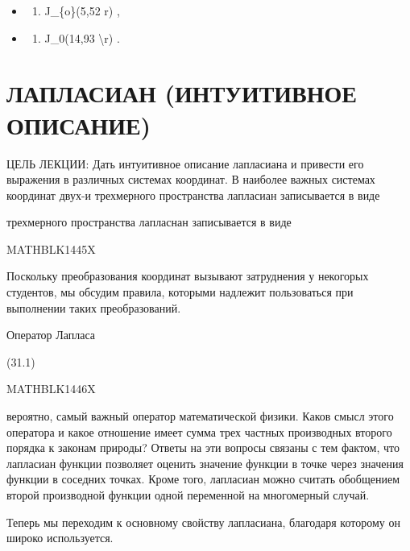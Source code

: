 \documentclass[
]{article}
\providecommand{\tightlist}{%
  \setlength{\itemsep}{0pt}\setlength{\parskip}{0pt}}
\begin{document}
{{{\begin{itemize}
  \begin{itemize}
  \tightlist
  \item
    \begin{enumerate}
    \def\labelenumi{\alph{enumi})}
    \tightlist
    \item
      J\_\{o\}(5,52 r) ,
    \end{enumerate}
  \item
    \begin{enumerate}
    \def\labelenumi{\arabic{enumi})}
    \setcounter{enumi}{5}
    \tightlist
    \item
      J\_0(14,93 \textbackslash r) .
    \end{enumerate}
  \end{itemize}
\end{itemize}

\section{ЛАПЛАСИАН (ИНТУИТИВНОЕ
ОПИСАНИЕ)}\label{ux43bux430ux43fux43bux430ux441ux438ux430ux43d-ux438ux43dux442ux443ux438ux442ux438ux432ux43dux43eux435-ux43eux43fux438ux441ux430ux43dux438ux435}

ЦЕЛЬ ЛЕКЦИИ: Дать интуитивное описание лапласиана и привести его
выражения в различных системах координат. В наиболее важных системах
координат двух-и трехмерного пространства лапласиан записывается в виде

трехмерного пространства лапласнан записывается в виде

MATHBLK1445X

Поскольку преобразования координат вызывают затруднения у некогорых
студентов, мы обсудим правила, которыми надлежит пользоваться при
выполнении таких преобразований.

Оператор Лапласа

(31.1)

MATHBLK1446X

вероятно, самый важный оператор математической физики. Каков смысл этого
оператора и какое отношение имеет сумма трех частных производных второго
порядка к законам природы? Ответы на эти вопросы связаны с тем фактом,
что лапласиан функции позволяет оценить значение функции в точке через
значения функции в соседних точках. Кроме того, лапласиан можно считать
обобщением второй производной функции одной переменной на многомерный
случай.

Теперь мы переходим к основному свойству лапласиана, благодаря которому
он широко используется.

}}}
\end{document}
